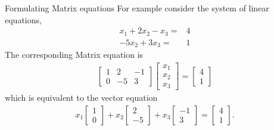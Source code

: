 \documentclass[10pt, aspectratio=169]{beamer}
\begin{document}
\begin{frame}{Formulating Matrix equations}
    For example consider the system of linear equations,
    \begin{align*}
        x_1 + 2x_2 - x_3  =& 4\\
            - 5x_2 + 3x_3 =& 1
    \end{align*}
    The corresponding Matrix equation is
    \begin{align*}
        \begin{bmatrix}
           1 &  2 & -1 \\
           0 & -5 &  3
       \end{bmatrix}
       \begin{bmatrix}
           x_1\\
           x_2\\
           x_3
       \end{bmatrix}
       =
       \begin{bmatrix}
           4\\
           1
       \end{bmatrix}
   \end{align*}
   which is equivalent to the vector equation
   \begin{align*}
       x_1\begin{bmatrix}
           1\\0
       \end{bmatrix}
       +
       x_2\begin{bmatrix}
           2\\-5
       \end{bmatrix}
       +
       x_3\begin{bmatrix}
           -1\\3
       \end{bmatrix}
       =
       \begin{bmatrix}
           4\\1
       \end{bmatrix}.
   \end{align*}
\end{frame}
\end{document}
